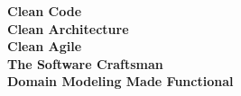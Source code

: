 
{\small
\textbf{Clean Code}
\\
\textbf{Clean Architecture}
\\
\textbf{Clean Agile}
\\
\textbf{The Software Craftsman}
\\
\textbf{Domain Modeling Made Functional}
}
